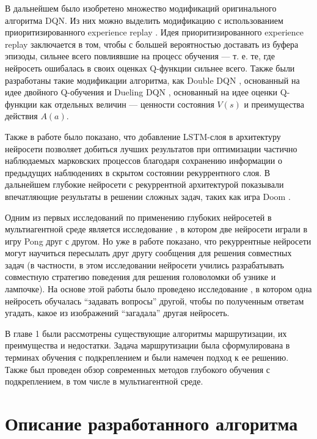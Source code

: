 \documentclass[specification, annotation]{itmo-student-thesis}
\begin{document}
В дальнейшем было изобретено множество модификаций оригинального алгоритма DQN.
Из них можно выделить модификацию с использованием приоритизированного
experience replay \cite{schaul2015prioritized}. Идея приоритизированного
experience replay заключается в том, чтобы с большей вероятностью доставать из
буфера эпизоды, сильнее всего повлиявшие на процесс обучения --- т. е. те,
где нейросеть ошибалась в своих оценках Q-функции сильнее всего.
Также были разработаны такие модификации алгоритма, как Double
DQN \cite{van2016deep}, основанный на идее двойного
Q-обучения \cite{hasselt2010double} и Dueling DQN \cite{wang2015dueling},
основанный на идее оценки Q-функции как отдельных величин --- ценности состояния
$V(s)$ и преимущества действия $A(a)$.

Также в работе \cite{hausknecht2015deep} было показано, что добавление
LSTM-слоя \cite{hochreiter1997long} в архитектуру нейросети позволяет добиться
лучших результатов при оптимизации частично наблюдаемых марковских процессов
благодаря сохранению информации о предыдущих наблюдениях в скрытом состоянии
рекуррентного слоя. В дальнейшем глубокие нейросети с рекуррентной архитектурой
показывали впечатляющие результаты в решении сложных задач, таких как игра
Doom \cite{lample2016playing}.

Одним из первых исследований по применению глубоких нейросетей в мультиагентной
среде является исследование \cite{tampuu2017multiagent}, в котором две нейросети
играли в игру Pong друг с другом. Но уже в работе \cite{foerster2016learning}
показано, что рекуррентные нейросети могут научиться пересылать друг другу сообщения для решения
совместных задач (в частности, в этом исследовании нейросети учились
разрабатывать совместную стратегию поведения для решения головоломки об узнике и
лампочке). На основе этой работы было проведено исследование
\cite{jorge2016learning}, в котором одна нейросеть обучалась
\enquote{задавать вопросы} другой, чтобы по полученным ответам угадать, какое из
изображений \enquote{загадала} другая нейросеть.

\chapterconclusion

В главе 1 были рассмотрены существующие алгоритмы маршрутизации, их преимущества
и недостатки. Задача маршрутизации была сформулирована в терминах обучения с
подкреплением и были намечен подход к ее решению. Также был проведен обзор
современных методов глубокого обучения с подкреплением, в том числе в
мультиагентной среде.

\finishrelatedwork

\chapter{Описание разработанного алгоритма}
\end{document}
